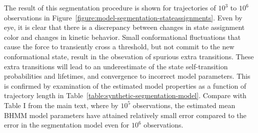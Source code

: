 \documentclass[endfloats,prl,twocolumn,superscriptaddress,nofootinbib,longbibliography]{revtex4-1}
\begin{document}
The result of this segmentation procedure is shown for trajectories of $10^3$ to $10^6$ observations in Figure~\ref{figure:model-segmentation-stateassignments}.
Even by eye, it is clear that there is a discrepancy between changes in state assignment color and changes in kinetic behavior.
Small conformational fluctuations that cause the force to transiently cross a threshold, but not commit to the new conformational state, result in the obsevation of spurious extra transitions.
These extra transitions will lead to an underestimate of the state self-transition probabilities and lifetimes, and convergence to incorrect model parameters.
This is confirmed by examination of the estimated model properties as a function of trajectory length in Table~\ref{table:synthetic-segmentation-model}.
Compare with Table I from the main text, where by $10^5$ observations, the estimated mean BHMM model parameters have attained relatively small error compared to the error in the segmentation model even for $10^6$ observations.
\end{document}
